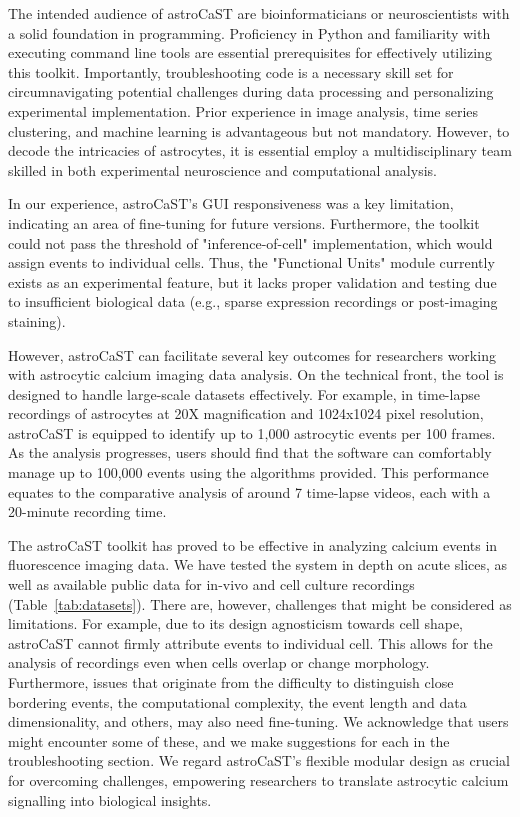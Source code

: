 \documentclass[utf8]{FrontiersinHarvard}
\newcommand{\tref}[1]{ (Table~\ref{tab:#1})}
\begin{document}
    The intended audience of astroCaST are bioinformaticians or neuroscientists with a solid foundation in programming. Proficiency in Python and familiarity with executing command line tools are essential prerequisites for effectively utilizing this toolkit. Importantly, troubleshooting code is a necessary skill set for circumnavigating potential challenges during data processing and personalizing experimental implementation. Prior experience in image analysis, time series clustering, and machine learning is advantageous but not mandatory. However, to decode the intricacies of astrocytes, it is essential employ a multidisciplinary team skilled in both experimental neuroscience and computational analysis.

    In our experience, astroCaST's \ac{GUI} responsiveness was a key limitation, indicating an area of fine-tuning for future versions. Furthermore, the toolkit could not pass the threshold of "inference-of-cell" implementation, which would assign events to individual cells. Thus, the "Functional Units" module currently exists as an experimental feature, but it lacks proper validation and testing due to insufficient biological data (e.g., sparse  expression recordings or post-imaging staining).

    However, \ac{astroCaST} can facilitate several key outcomes for researchers working with astrocytic calcium imaging data analysis. On the technical front, the tool is designed to handle large-scale datasets effectively. For example, in time-lapse recordings of astrocytes at 20X magnification and 1024x1024 pixel resolution, astroCaST is equipped to identify up to 1,000 astrocytic events per 100 frames. As the analysis progresses, users should find that the software can comfortably manage up to 100,000 events using the algorithms provided. This performance equates to the comparative analysis of around 7 time-lapse videos, each with a 20-minute recording time. 

    The astroCaST toolkit has proved to be effective in analyzing calcium events in fluorescence imaging data. We have tested the system in depth on acute slices, as well as available public data for in-vivo and cell culture recordings\tref{datasets}. There are, however, challenges that might be considered as limitations. For example, due to its design agnosticism towards cell shape, astroCaST cannot firmly attribute events to individual cell. This allows for the analysis of recordings even when cells overlap or change morphology. Furthermore, issues that originate from the difficulty to distinguish close bordering events, the computational complexity, the event length and data dimensionality, and others, may also need fine-tuning. We acknowledge that users might encounter some of these, and we make suggestions for each in the troubleshooting section. We regard astroCaST's flexible modular design as crucial for overcoming challenges, empowering researchers to translate astrocytic calcium signalling into biological insights.
\end{document}
